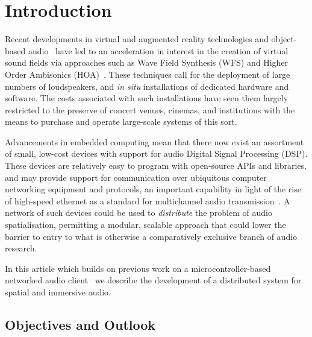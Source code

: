 \section{Introduction}\label{sec:introduction}

Recent developments in virtual and augmented reality technologies and
object-based audio~\citep{geier_object-based_2010} have led to an acceleration
in interest in the creation of virtual sound fields via approaches such as Wave
Field Synthesis (WFS) and Higher Order Ambisonics
(HOA)~\citep{berkhout_acoustic_1993,ahrens_theory_2008,daniel_further_2003,
    frank_producing_2015}.
These techniques call for the deployment of large numbers of loudspeakers, and
\textit{in situ} installations of dedicated hardware and software.
The costs associated with such installations have seen them largely restricted
to the preserve of concert venues, cinemas, and institutions with the means to
purchase and operate large-scale systems of this sort.

Advancements in embedded computing mean that there now exist an assortment of
small, low-cost devices with support for audio Digital Signal Processing (DSP).
These devices are relatively easy to program with open-source APIs and
libraries, and may provide support for communication over ubiquitous computer
networking equipment and protocols, an important capability in light of the
rise of high-speed ethernet as a standard for multichannel audio
transmission~\citep{bakker_introduction_2014}.
A network of such devices could be used to \textit{distribute} the problem of
audio spatialisation, permitting a modular, scalable approach that could lower
the barrier to entry to what is otherwise a comparatively exclusive branch of
audio research.

In this article \textemdash{} which builds on previous work on a
microcontroller-based networked audio
client~\citep{rushton_microcontroller-based_2023} \textemdash{} we describe the
development of a distributed system for spatial and immersive audio.






\subsection{Objectives and Outlook}\label{subsec:objectives}

